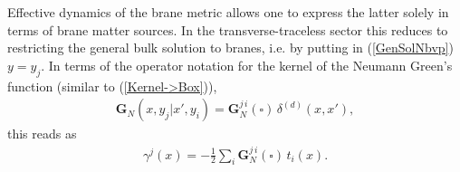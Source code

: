 \documentclass[a4paper,12pt]{article}
\newcommand{\ddim}{{d}}
\newcommand{\bBox}{\square}  %
\newcommand{\GrN}{ \mathbf{G}_{N}}  %
\begin{document}
Effective dynamics of the brane metric allows one to express the
latter solely in terms of brane matter sources. In the
transverse-traceless sector this reduces to restricting the
general bulk solution to branes, i.e. by putting in
(\ref{GenSolNbvp}) $y=y_j$. In terms of the operator notation for
the kernel of the Neumann Green's function (similar to
(\ref{Kernel->Box})),
    \begin{eqnarray}
     \GrN(x,y_j|x',y_i)=
     {\mathbf G}^{j\,i}_N(\bBox)\,
     \delta^{(\ddim)}(x,x'),        \label{GenRestrSolNbvp}
    \end{eqnarray}
this reads as
    \begin{eqnarray}
     \gamma^j(x)=-\frac12 \sum_i
     {\mathbf G}^{j\,i}_N(\bBox)
     \,t_i(x).                    \label{NGravOperRescDynamics}
    \end{eqnarray}
\end{document}
